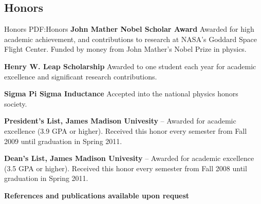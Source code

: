 \documentclass[letterpaper,MMMyyyy,nonstop]{simpleresumecv}
\begin{document}
\begin{body}

\section
{Honors}
{Honors}
{PDF:Honors}
\textbf{John Mather Nobel Scholar Award}
\hfill
{}
\BulletItem
Awarded for high academic achievement, and contributions to research at NASA's Goddard Space Flight Center.  Funded by money from John Mather's Nobel Prize in physics.


\textbf{Henry W. Leap Scholarship}
\hfill
{}
\BulletItem
Awarded to one student each year for academic excellence and significant research contributions.

\textbf{Sigma Pi Sigma Inductance}
\hfill
{}
\BulletItem
Accepted into the national physics honors society.

\textbf{President's List, James Madison Univesity}
\hfill
{} -- 
\BulletItem
Awarded for academic excellence (3.9 GPA or higher).  Received this honor every semester from Fall 2009 until graduation in Spring 2011.

\textbf{Dean's List, James Madison Univesity}
\hfill
{} --
\BulletItem
Awarded for academic excellence (3.5 GPA or higher).  Received this honor every semester from Fall 2008 until graduation in Spring 2011.

\BigGap
\Gap
\textbf{ References and publications available upon request}
\end{body}
\end{document}
